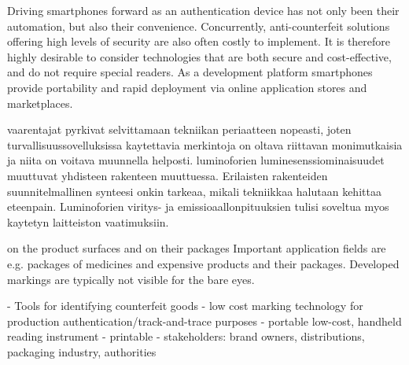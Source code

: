 \documentclass[thesis.tex]{subfiles}
\begin{document}
Driving smartphones forward as an authentication device has not only been their automation, but also their convenience. Concurrently, anti-counterfeit solutions offering high levels of security are also often costly to implement. It is therefore highly desirable to consider technologies that are both secure and cost-effective, and do not require special readers. As a development platform smartphones provide portability and rapid deployment via online application stores and marketplaces.

vaarentajat pyrkivat selvittamaan tekniikan periaatteen nopeasti, joten turvallisuussovelluksissa kaytettavia merkintoja on oltava riittavan monimutkaisia ja niita on voitava muunnella helposti. luminoforien luminesenssiominaisuudet muuttuvat yhdisteen rakenteen muuttuessa. Erilaisten rakenteiden suunnitelmallinen synteesi onkin tarkeaa, mikali tekniikkaa halutaan kehittaa eteenpain. Luminoforien viritys- ja emissioaallonpituuksien tulisi soveltua myos kaytetyn laitteiston vaatimuksiin.

on the product surfaces and on their packages
Important application fields are e.g. packages of medicines and expensive products and their packages. Developed markings are typically not visible for the bare eyes.

- Tools for identifying counterfeit goods
- low cost marking technology for production authentication/track-and-trace purposes
- portable low-cost, handheld reading instrument
- printable
- stakeholders: brand owners, distributions, packaging industry, authorities


\end{document}
